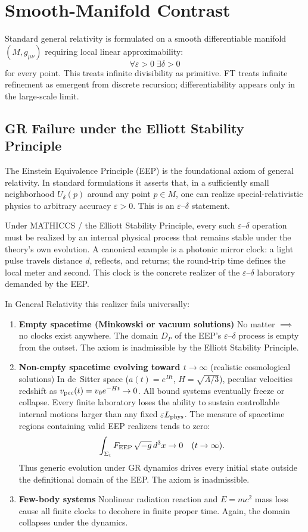\documentclass[11pt,a4paper]{article}
\begin{document}
\section{Smooth-Manifold Contrast}
Standard general relativity is formulated on a smooth differentiable manifold $(M,g_{\mu\nu})$ requiring local linear approximability:
\[
\forall\varepsilon>0\;\exists\delta>0
\]
for every point. This treats infinite divisibility as primitive. FT treats infinite refinement as emergent from discrete recursion; differentiability appears only in the large-scale limit.

\subsection{GR Failure under the Elliott Stability Principle}
The Einstein Equivalence Principle (EEP) is the foundational axiom of general relativity. In standard formulations it asserts that, in a sufficiently small neighborhood $U_\delta(p)$ around any point $p\in M$, one can realize special-relativistic physics to arbitrary accuracy $\varepsilon>0$. This is an $\varepsilon$--$\delta$ statement.

Under MATHICCS / the Elliott Stability Principle, every such $\varepsilon$--$\delta$ operation must be realized by an internal physical process that remains stable under the theory's own evolution. A canonical example is a photonic mirror clock: a light pulse travels distance $d$, reflects, and returns; the round-trip time defines the local meter and second. This clock is the concrete realizer of the $\varepsilon$--$\delta$ laboratory demanded by the EEP.

In General Relativity this realizer fails universally:

\begin{enumerate}
\item \textbf{Empty spacetime (Minkowski or vacuum solutions)}
No matter $\implies$ no clocks exist anywhere. The domain $D_P$ of the EEP's $\varepsilon$--$\delta$ process is empty from the outset. The axiom is inadmissible by the Elliott Stability Principle.

\item \textbf{Non-empty spacetime evolving toward $t\to\infty$} (realistic cosmological solutions)
In de~Sitter space ($a(t)=e^{Ht}$, $H=\sqrt{\Lambda/3}$), peculiar velocities redshift as $v_{\rm pec}(t)=v_0 e^{-Ht}\to 0$. All bound systems eventually freeze or collapse. Every finite laboratory loses the ability to sustain controllable internal motions larger than any fixed $\varepsilon L_{\rm phys}$. The measure of spacetime regions containing valid EEP realizers tends to zero:
\[
\int_{\Sigma_t} F_{\rm EEP}\,\sqrt{-g}\,d^3x \to 0 \quad (t\to\infty).
\]
Thus generic evolution under GR dynamics drives every initial state outside the definitional domain of the EEP. The axiom is inadmissible.

\item \textbf{Few-body systems}
Nonlinear radiation reaction and $E=mc^2$ mass loss cause all finite clocks to decohere in finite proper time. Again, the domain collapses under the dynamics.
\end{enumerate}
\end{document}
